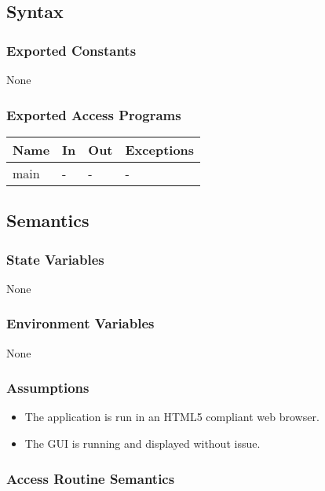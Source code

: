\documentclass[12pt, titlepage]{article}
\begin{document}
\subsection{Syntax}

\subsubsection{Exported Constants}
None

\subsubsection{Exported Access Programs}

\begin{center}
\begin{tabular}{L{2cm} L{4cm} L{4cm} L{2cm}}
\hline
\textbf{Name} & \textbf{In} & \textbf{Out} & \textbf{Exceptions} \\
\hline
main & - & - & - \\
\hline
\end{tabular}
\end{center}

\subsection{Semantics}

\subsubsection{State Variables}
None

\subsubsection{Environment Variables}
None

\subsubsection{Assumptions}
\begin{itemize}
  \item The application is run in an HTML5 compliant web browser.
  \item The GUI is running and displayed without issue.
\end{itemize}

\subsubsection{Access Routine Semantics}
\end{document}
